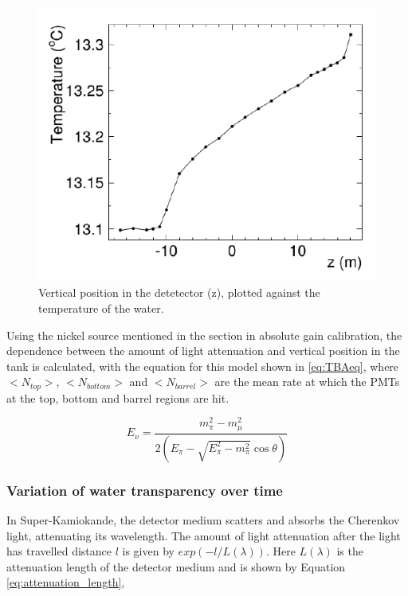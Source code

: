 \begin{figure}
    \includegraphics[width=\textwidth]{Figures/watergrad.png}
\caption{Vertical position in the detetector (z), plotted against the temperature of the water.}
    \label{fig:watergrad}
\end{figure}

Using the nickel source mentioned in the section in absolute gain calibration, the dependence between the amount of light attenuation and vertical position in the tank is calculated, with the equation for this model shown in \ref{eq:TBAeq}, where $<N_{top}>$, $<N_{bottom}>$ and $<N_{barrel}>$ are the mean rate at which the PMTs at the top, bottom and barrel regions are hit.  

\begin{equation}
    E_{\nu}=\frac{m_{\pi}^{2}-m_{\mu}^{2}}{2\left(E_{\pi}-\sqrt{E_{\pi}^{2}-m_{\pi}^{2}} \cos \theta\right)}
\label{eq:TBAeq}
\end{equation}

\subsubsection{Variation of water transparency over time}

In Super-Kamiokande, the detector medium scatters and absorbs the Cherenkov light, attenuating its wavelength. The amount of light attenuation after the light has travelled distance $l$ is given by $exp(-l/L(\lambda))$. Here $L(\lambda)$ is the attenuation length of the detector medium and is shown by Equation \ref{eq:attenuation_length}, 

